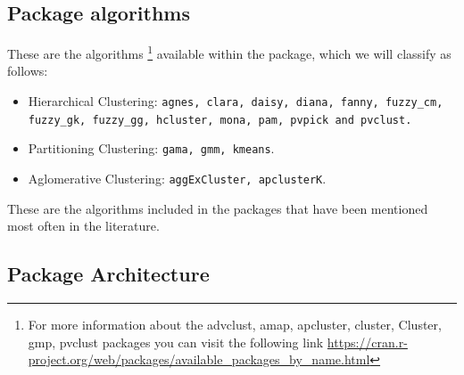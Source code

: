 \subsection{Package algorithms}
These are the algorithms \footnote{For more information about the advclust, amap, apcluster, cluster, Cluster, gmp, pvclust packages you can visit the following link \url{https://cran.r-project.org/web/packages/available_packages_by_name.html}} available within the package, which we will classify as follows:
\begin{itemize}
  \item Hierarchical Clustering: \texttt{agnes, clara, daisy, diana, fanny, fuzzy\_cm, fuzzy\_gk, fuzzy\_gg, hcluster, mona, pam, pvpick and pvclust.}
  \item Partitioning Clustering: \texttt{gama, gmm, kmeans}.
  \item Aglomerative Clustering: \texttt{aggExCluster, apclusterK}.
\end{itemize}


These are the algorithms included in the packages that have been mentioned most often in the literature.

\subsection{Package Architecture}

